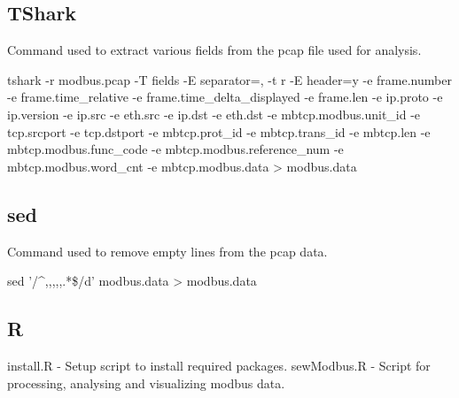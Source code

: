 \documentclass[]{article}
\begin{document}
\subsection{TShark}\label{tshark}

Command used to extract various fields from the pcap file used for
analysis.

tshark -r modbus.pcap -T fields -E separator=, -t r -E header=y -e
frame.number -e frame.time\_relative -e frame.time\_delta\_displayed -e
frame.len -e ip.proto -e ip.version -e ip.src -e eth.src -e ip.dst -e
eth.dst -e mbtcp.modbus.unit\_id -e tcp.srcport -e tcp.dstport -e
mbtcp.prot\_id -e mbtcp.trans\_id -e mbtcp.len -e
mbtcp.modbus.func\_code -e mbtcp.modbus.reference\_num -e
mbtcp.modbus.word\_cnt -e mbtcp.modbus.data \textgreater{} modbus.data

\subsection{sed}\label{sed}

Command used to remove empty lines from the pcap data.

sed '/\^{},,,,,.*\$/d' modbus.data \textgreater{} modbus.data

\subsection{R}\label{r}

install.R - Setup script to install required packages. sewModbus.R -
Script for processing, analysing and visualizing modbus data.
\end{document}
